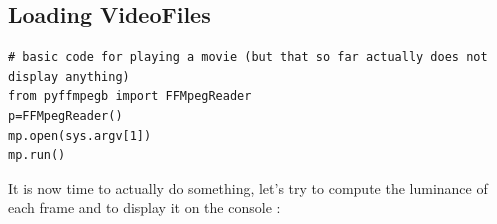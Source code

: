 \documentclass{report}
\begin{document}
\subsection{Loading VideoFiles}
\begin{lstlisting}
# basic code for playing a movie (but that so far actually does not display anything)
from pyffmpegb import FFMpegReader
p=FFMpegReader()
mp.open(sys.argv[1])
mp.run()

\end{lstlisting}











It is now time to actually do something, let's try to compute the luminance of each frame and to display it on the console :
\end{document}
